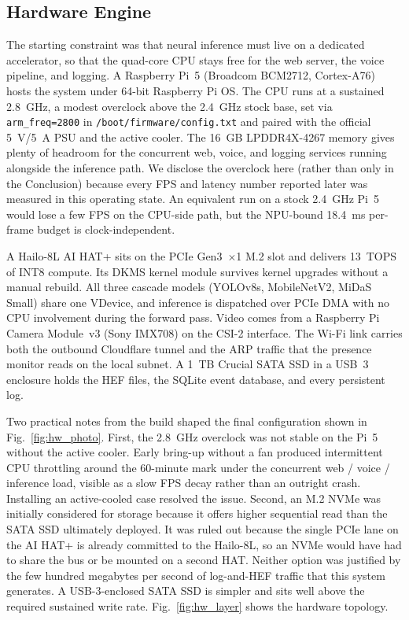 \documentclass{ieeeaccess}
\begin{document}
\subsection{Hardware Engine}
The starting constraint was that neural inference must live on a dedicated accelerator, so that the quad-core CPU stays free for the web server, the voice pipeline, and logging. A Raspberry Pi~5 (Broadcom BCM2712, Cortex-A76) hosts the system under 64-bit Raspberry Pi OS. The CPU runs at a sustained 2.8~GHz, a modest overclock above the 2.4~GHz stock base, set via \texttt{arm\_freq=2800} in \texttt{/boot/firmware/config.txt} and paired with the official 5~V/5~A PSU and the active cooler. The 16~GB LPDDR4X-4267 memory gives plenty of headroom for the concurrent web, voice, and logging services running alongside the inference path. We disclose the overclock here (rather than only in the Conclusion) because every FPS and latency number reported later was measured in this operating state. An equivalent run on a stock 2.4~GHz Pi~5 would lose a few FPS on the CPU-side path, but the NPU-bound 18.4~ms per-frame budget is clock-independent.

A Hailo-8L AI HAT+ sits on the PCIe Gen3~$\times$1 M.2 slot and delivers 13~TOPS of INT8 compute. Its DKMS kernel module survives kernel upgrades without a manual rebuild. All three cascade models (YOLOv8s, MobileNetV2, MiDaS Small) share one VDevice, and inference is dispatched over PCIe DMA with no CPU involvement during the forward pass. Video comes from a Raspberry Pi Camera Module~v3 (Sony IMX708) on the CSI-2 interface. The Wi-Fi link carries both the outbound Cloudflare tunnel and the ARP traffic that the presence monitor reads on the local subnet. A 1~TB Crucial SATA SSD in a USB~3 enclosure holds the HEF files, the SQLite event database, and every persistent log.

Two practical notes from the build shaped the final configuration shown in Fig.~\ref{fig:hw_photo}. First, the 2.8~GHz overclock was not stable on the Pi~5 without the active cooler. Early bring-up without a fan produced intermittent CPU throttling around the 60-minute mark under the concurrent web / voice / inference load, visible as a slow FPS decay rather than an outright crash. Installing an active-cooled case resolved the issue. Second, an M.2 NVMe was initially considered for storage because it offers higher sequential read than the SATA SSD ultimately deployed. It was ruled out because the single PCIe lane on the AI HAT+ is already committed to the Hailo-8L, so an NVMe would have had to share the bus or be mounted on a second HAT. Neither option was justified by the few hundred megabytes per second of log-and-HEF traffic that this system generates. A USB-3-enclosed SATA SSD is simpler and sits well above the required sustained write rate. Fig.~\ref{fig:hw_layer} shows the hardware topology.
\end{document}

